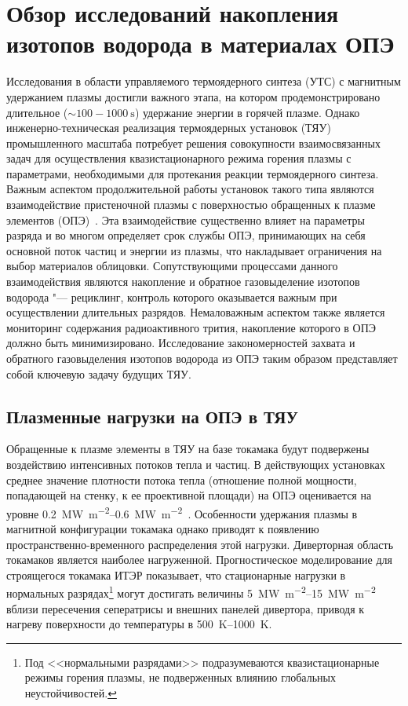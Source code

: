 \chapter{Обзор исследований накопления изотопов водорода в материалах ОПЭ}\label{ch:ch1}

Исследования в области управляемого термоядерного синтеза (УТС) с магнитным удержанием плазмы достигли важного этапа, на котором продемонстрировано длительное ($\sim100-\SI{1000}{\second}$) удержание энергии в горячей плазме. Однако инженерно-техническая реализация термоядерных установок (ТЯУ) промышленного масштаба потребует решения совокупности взаимосвязанных задач для осуществления квазистационарного режима горения плазмы с параметрами, необходимыми для протекания реакции термоядерного синтеза. Важным аспектом продолжительной работы установок такого типа являются взаимодействие пристеночной плазмы с поверхностью обращенных к плазме элементов (ОПЭ)~\cite{Krieger2025}. Эта взаимодействие существенно влияет на параметры разряда и во многом определяет срок службы ОПЭ, принимающих на себя основной поток частиц и энергии из плазмы, что накладывает ограничения на выбор материалов облицовки. Сопутствующими процессами данного взаимодействия являются накопление и обратное газовыделение изотопов водорода "--- рециклинг, контроль которого оказывается важным при осуществлении длительных разрядов. Немаловажным аспектом также является мониторинг содержания радиоактивного трития, накопление которого в ОПЭ должно быть минимизировано. Исследование закономерностей захвата и обратного газовыделения изотопов водорода из ОПЭ таким образом представляет собой ключевую задачу будущих ТЯУ.

\section{Плазменные нагрузки на ОПЭ в ТЯУ}\label{sec:ch1/sec1}

Обращенные к плазме элементы в ТЯУ на базе токамака будут подвержены воздействию интенсивных потоков тепла и частиц. В действующих установках среднее значение плотности потока тепла (отношение полной мощности, попадающей на стенку, к ее проективной площади) на ОПЭ оценивается на уровне \SIrange{0.2}{0.6}{\mega\watt\per\metre\squared}~\cite{Mazul2021}. Особенности удержания плазмы в магнитной конфигурации токамака однако приводят к появлению пространственно-временного распределения этой нагрузки. Диверторная область токамаков является наиболее нагруженной. Прогностическое моделирование для строящегося токамака ИТЭР показывает, что стационарные нагрузки в нормальных разрядах\footnote{Под <<нормальными разрядами>> подразумеваются квазистационарные режимы горения плазмы, не подверженных влиянию глобальных неустойчивостей.} могут достигать величины \SIrange{5}{15}{\mega\watt\per\meter\squared}~\cite{Pitts2019,Orrico2023} вблизи пересечения сеператрисы и внешних панелей дивертора, приводя к нагреву поверхности до температуры в \SIrange{500}{1000}{\kelvin}.

